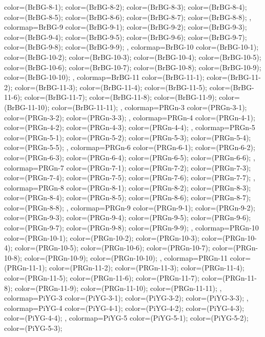 {{  color=(BrBG-8-1);
  color=(BrBG-8-2);
  color=(BrBG-8-3);
  color=(BrBG-8-4);
  color=(BrBG-8-5);
  color=(BrBG-8-6);
  color=(BrBG-8-7);
  color=(BrBG-8-8);
},
colormap={BrBG-9}{
  color=(BrBG-9-1);
  color=(BrBG-9-2);
  color=(BrBG-9-3);
  color=(BrBG-9-4);
  color=(BrBG-9-5);
  color=(BrBG-9-6);
  color=(BrBG-9-7);
  color=(BrBG-9-8);
  color=(BrBG-9-9);
},
colormap={BrBG-10}{
  color=(BrBG-10-1);
  color=(BrBG-10-2);
  color=(BrBG-10-3);
  color=(BrBG-10-4);
  color=(BrBG-10-5);
  color=(BrBG-10-6);
  color=(BrBG-10-7);
  color=(BrBG-10-8);
  color=(BrBG-10-9);
  color=(BrBG-10-10);
},
colormap={BrBG-11}{
  color=(BrBG-11-1);
  color=(BrBG-11-2);
  color=(BrBG-11-3);
  color=(BrBG-11-4);
  color=(BrBG-11-5);
  color=(BrBG-11-6);
  color=(BrBG-11-7);
  color=(BrBG-11-8);
  color=(BrBG-11-9);
  color=(BrBG-11-10);
  color=(BrBG-11-11);
},
colormap={PRGn-3}{
  color=(PRGn-3-1);
  color=(PRGn-3-2);
  color=(PRGn-3-3);
},
colormap={PRGn-4}{
  color=(PRGn-4-1);
  color=(PRGn-4-2);
  color=(PRGn-4-3);
  color=(PRGn-4-4);
},
colormap={PRGn-5}{
  color=(PRGn-5-1);
  color=(PRGn-5-2);
  color=(PRGn-5-3);
  color=(PRGn-5-4);
  color=(PRGn-5-5);
},
colormap={PRGn-6}{
  color=(PRGn-6-1);
  color=(PRGn-6-2);
  color=(PRGn-6-3);
  color=(PRGn-6-4);
  color=(PRGn-6-5);
  color=(PRGn-6-6);
},
colormap={PRGn-7}{
  color=(PRGn-7-1);
  color=(PRGn-7-2);
  color=(PRGn-7-3);
  color=(PRGn-7-4);
  color=(PRGn-7-5);
  color=(PRGn-7-6);
  color=(PRGn-7-7);
},
colormap={PRGn-8}{
  color=(PRGn-8-1);
  color=(PRGn-8-2);
  color=(PRGn-8-3);
  color=(PRGn-8-4);
  color=(PRGn-8-5);
  color=(PRGn-8-6);
  color=(PRGn-8-7);
  color=(PRGn-8-8);
},
colormap={PRGn-9}{
  color=(PRGn-9-1);
  color=(PRGn-9-2);
  color=(PRGn-9-3);
  color=(PRGn-9-4);
  color=(PRGn-9-5);
  color=(PRGn-9-6);
  color=(PRGn-9-7);
  color=(PRGn-9-8);
  color=(PRGn-9-9);
},
colormap={PRGn-10}{
  color=(PRGn-10-1);
  color=(PRGn-10-2);
  color=(PRGn-10-3);
  color=(PRGn-10-4);
  color=(PRGn-10-5);
  color=(PRGn-10-6);
  color=(PRGn-10-7);
  color=(PRGn-10-8);
  color=(PRGn-10-9);
  color=(PRGn-10-10);
},
colormap={PRGn-11}{
  color=(PRGn-11-1);
  color=(PRGn-11-2);
  color=(PRGn-11-3);
  color=(PRGn-11-4);
  color=(PRGn-11-5);
  color=(PRGn-11-6);
  color=(PRGn-11-7);
  color=(PRGn-11-8);
  color=(PRGn-11-9);
  color=(PRGn-11-10);
  color=(PRGn-11-11);
},
colormap={PiYG-3}{
  color=(PiYG-3-1);
  color=(PiYG-3-2);
  color=(PiYG-3-3);
},
colormap={PiYG-4}{
  color=(PiYG-4-1);
  color=(PiYG-4-2);
  color=(PiYG-4-3);
  color=(PiYG-4-4);
},
colormap={PiYG-5}{
  color=(PiYG-5-1);
  color=(PiYG-5-2);
  color=(PiYG-5-3);
}}

